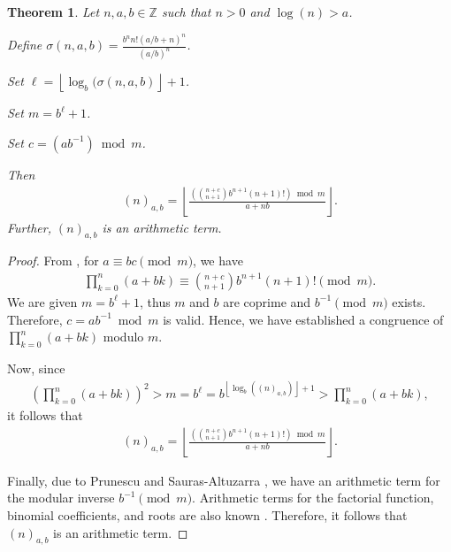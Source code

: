 \documentclass[10pt,a4paper]{article}
\theoremstyle{plain}
\newtheorem{theorem}{Theorem}[section]
\newcommand{\floor}[1]{\left\lfloor #1 \right\rfloor}
\newcommand{\Z}{\mathbb{Z}}
\begin{document}
\begin{theorem} \label{proof:pochhammer1}
Let $n,a,b \in \Z$ such that $n > 0$ and $\log(n) > a$.

Define $\sigma(n,a,b) = \frac{b^n n! (a/b+n)^n}{(a/b)^n}$.

Set $\ell = \floor{\log_b(\sigma(n,a,b)}+1$.

Set $m = b^{\ell}+1$.

Set $c = (ab^{-1}) \bmod m$.

Then
\begin{align*}
(n)_{a,b} = \floor{\frac{\left( \binom{n+c}{n+1} b^{n+1} (n+1)! \right) \bmod m}{a+nb}}.
\end{align*}
Further, $(n)_{a,b}$ is an arithmetic term.
\end{theorem}
\begin{proof}
From \cite{matiyasevich1993hilbert}, for $a \equiv bc \pmod{m}$, we have
\begin{align} \label{formula:matiyasevich1}
\prod_{k=0}^n (a+bk) \equiv \binom{n+c}{n+1} b^{n+1} (n+1)! \pmod{m} .
\end{align}
We are given $m = b^{\ell}+1$, thus $m$ and $b$ are coprime and $b^{-1} \pmod{m}$ exists. Therefore, $c = ab^{-1} \bmod m$ is valid. Hence, we have established a congruence of $\prod_{k=0}^n (a+bk)$ modulo $m$.

Now, since
\begin{align*}
\left( \prod_{k=0}^n (a+bk) \right)^2 > m = b^{\ell} = b^{\floor{\log_b((n)_{a,b})}+1} > \prod_{k=0}^n (a+bk) ,
\end{align*}
it follows that
\begin{align*}
(n)_{a,b} = \floor{\frac{\left( \binom{n+c}{n+1} b^{n+1} (n+1)! \right) \bmod m}{a+nb}}.
\end{align*}

Finally, due to Prunescu and Sauras-Altuzarra \cite{prunescu2024factorial}, we have an arithmetic term for the modular inverse $b^{-1} \pmod{m}$. Arithmetic terms for the factorial function, binomial coefficients, and roots are also known \cite{robinson1952arithmetic,shunia2023simple,shunia2024polynomial, prunescu2024factorial}. Therefore, it follows that $(n)_{a,b}$ is an arithmetic term.
\end{proof}
\end{document}
